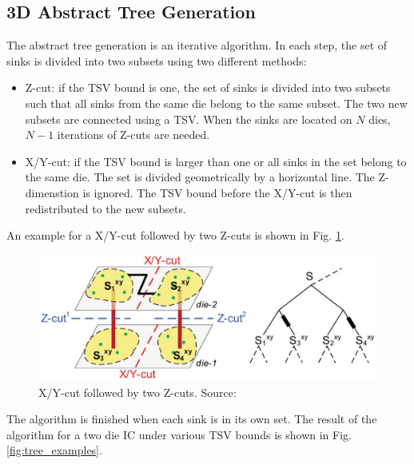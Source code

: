 \documentclass[conference]{IEEEtran}
\begin{document}
\subsection{3D Abstract Tree Generation}
The abstract tree generation is an iterative algorithm. In each step, the set of sinks is divided into two subsets using two different methods:
\begin{itemize}
\item Z-cut: if the TSV bound is one, the set of sinks is divided into two subsets such that all sinks from the same die belong to the same subset. The two new subsets are connected using a TSV. When the sinks are located on $N$ dies, $N-1$ iterations of Z-cuts are needed.
\item X/Y-cut: if the TSV bound is larger than one or all sinks in the set belong to the same die. The set is divided geometrically by a horizontal line. The Z-dimenstion is ignored. The TSV bound before the X/Y-cut is then redistributed to the new subsets.
\end{itemize}
An example for a X/Y-cut followed by two Z-cuts is shown in Fig. \ref{fig:cuts}.

\begin{figure}[htbp]
	\includegraphics[width=1\linewidth]{img/cuts.png}
	\centering
	\caption{X/Y-cut followed by two Z-cuts. Source: \cite{b2}}
	\label{fig:cuts}
\end{figure}

The algorithm is finished when each sink is in its own set. The result of the algorithm for a two die IC under various TSV bounds is shown in Fig. \ref{fig:tree_examples}.
\end{document}
